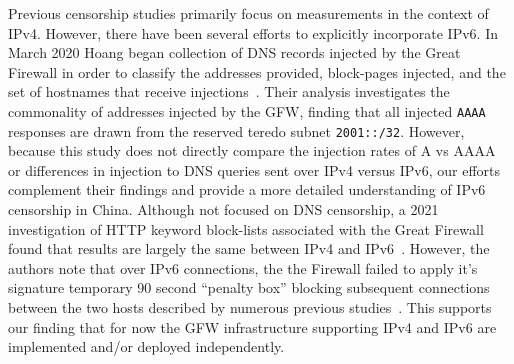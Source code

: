 Previous censorship studies primarily focus on measurements in the context of
IPv4. However, there have been several efforts to explicitly incorporate IPv6.
In March 2020 Hoang \etal began collection of DNS records injected by the Great
Firewall in order to classify the addresses provided, block-pages injected, and
the set of hostnames that receive injections~\cite{USESEC21:GFWatch}. Their
analysis investigates the commonality of addresses injected by the GFW, finding
that all injected \texttt{AAAA} responses are drawn from the reserved teredo
subnet \texttt{2001::/32}. However, because this study does not directly
compare the injection rates of A vs AAAA or differences in injection to DNS
queries sent over IPv4 versus IPv6, our efforts complement their findings and
provide a more detailed understanding of IPv6 censorship in China.
%
Although not focused on DNS censorship, a 2021 investigation of HTTP keyword
block-lists associated with the Great Firewall found that results are largely
the same between IPv4 and IPv6~\cite{weinberg2021chinese}. However, the authors
note that over IPv6 connections, the the Firewall failed to apply it's
signature temporary 90 second ``penalty box'' blocking subsequent connections
between the two hosts described by numerous previous
studies~\cite{xu2011internet,clayton2006ignoring}. This supports our finding
that for now the GFW infrastructure supporting IPv4 and IPv6 are implemented
and/or deployed independently.
